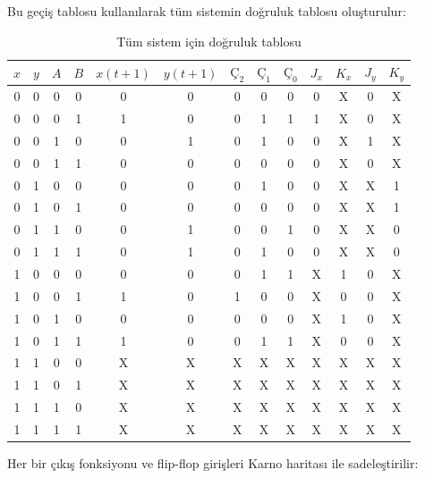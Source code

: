 \begin{ornek}[B.17]
Bu geçiş tablosu kullanılarak tüm sistemin doğruluk tablosu oluşturulur:

\begin{table}[H]
\centering
\caption*{Tüm sistem için doğruluk tablosu}
\label{tab:B.19}
\small
\begin{tabular}{cccc|cc|ccc|cccc}
\toprule
$x$ & $y$ & $A$ & $B$ & $x(t+1)$ & $y(t+1)$ & $\text{Ç}_2$ & $\text{Ç}_1$ & $\text{Ç}_0$ & $J_x$ & $K_x$ & $J_y$ & $K_y$ \\
\midrule
0 & 0 & 0 & 0 & 0 & 0 & 0 & 0 & 0 & 0 & X & 0 & X \\
0 & 0 & 0 & 1 & 1 & 0 & 0 & 1 & 1 & 1 & X & 0 & X \\
0 & 0 & 1 & 0 & 0 & 1 & 0 & 1 & 0 & 0 & X & 1 & X \\
0 & 0 & 1 & 1 & 0 & 0 & 0 & 0 & 0 & 0 & X & 0 & X \\
0 & 1 & 0 & 0 & 0 & 0 & 0 & 1 & 0 & 0 & X & X & 1 \\
0 & 1 & 0 & 1 & 0 & 0 & 0 & 0 & 0 & 0 & X & X & 1 \\
0 & 1 & 1 & 0 & 0 & 1 & 0 & 0 & 1 & 0 & X & X & 0 \\
0 & 1 & 1 & 1 & 0 & 1 & 0 & 1 & 0 & 0 & X & X & 0 \\
1 & 0 & 0 & 0 & 0 & 0 & 0 & 1 & 1 & X & 1 & 0 & X \\
1 & 0 & 0 & 1 & 1 & 0 & 1 & 0 & 0 & X & 0 & 0 & X \\
1 & 0 & 1 & 0 & 0 & 0 & 0 & 0 & 0 & X & 1 & 0 & X \\
1 & 0 & 1 & 1 & 1 & 0 & 0 & 1 & 1 & X & 0 & 0 & X \\
1 & 1 & 0 & 0 & X & X & X & X & X & X & X & X & X \\
1 & 1 & 0 & 1 & X & X & X & X & X & X & X & X & X \\
1 & 1 & 1 & 0 & X & X & X & X & X & X & X & X & X \\
1 & 1 & 1 & 1 & X & X & X & X & X & X & X & X & X \\
\bottomrule
\end{tabular}
\end{table}

Her bir çıkış fonksiyonu ve flip-flop girişleri Karno haritası ile sadeleştirilir:

\newcommand{\sayackarno}[5]{%
\begin{tikzpicture}[scale=0.6]
    \draw[thick] (0,0) grid (4,4);
    \node[above left, font=\footnotesize] at (0, 4) {$xy$\textbackslash\,$AB$};
    \node[above, font=\footnotesize] at (0.5, 4) {00};
    \node[above, font=\footnotesize] at (1.5, 4) {01};
    \node[above, font=\footnotesize] at (2.5, 4) {11};
    \node[above, font=\footnotesize] at (3.5, 4) {10};
    \node[left, font=\footnotesize] at (0, 3.5) {00};
    \node[left, font=\footnotesize] at (0, 2.5) {01};
    \node[left, font=\footnotesize] at (0, 1.5) {11};
    \node[left, font=\footnotesize] at (0, 0.5) {10};
    #1 #2 #3 #4 #5
\end{tikzpicture}%
}


\end{ornek}
